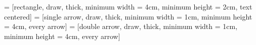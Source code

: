  = [rectangle, draw, thick, minimum width = 4cm, minimum height = 2cm, text centered]
 = [single arrow, draw, thick, minimum width = 1cm, minimum height = 4cm, every arrow]
 = [double arrow, draw, thick, minimum width = 1cm, minimum height = 4cm, every arrow]


\graphicspath{
	{assets/figures/}
	{assets/slides/}
	{assets/icons/}
}


